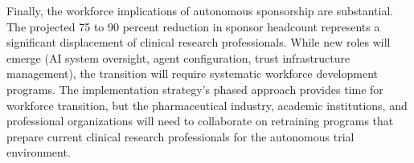 Finally, the workforce implications of autonomous sponsorship are substantial. The
projected 75 to 90 percent reduction in sponsor headcount represents a significant
displacement of clinical research professionals. While new roles will emerge (AI system
oversight, agent configuration, trust infrastructure management), the transition will
require systematic workforce development programs. The implementation strategy's phased
approach provides time for workforce transition, but the pharmaceutical industry, academic
institutions, and professional organizations will need to collaborate on retraining
programs that prepare current clinical research professionals for the autonomous
trial environment.
